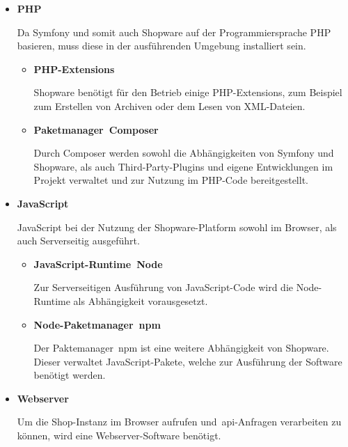 \begin{itemize}
    \item {
        \textbf{PHP}\par
        Da Symfony und somit auch Shopware auf der Programmiersprache PHP basieren, muss diese in der ausführenden
        Umgebung installiert sein.

        \begin{itemize}
            \item {
                \textbf{PHP-Extensions}\par
                Shopware benötigt für den Betrieb einige PHP-Extensions, zum Beispiel zum Erstellen von Archiven
                oder dem Lesen von XML-Dateien.
            }

            \item {
                \textbf{Paketmanager\ \glqq Composer\grqq}\par
                Durch Composer werden sowohl die Abhängigkeiten von Symfony und Shopware, als auch Third-Party-Plugins
                und eigene Entwicklungen im Projekt verwaltet und zur Nutzung im PHP-Code bereitgestellt.
            }
        \end{itemize}
    }

    \item {
        \textbf{JavaScript}\par
        JavaScript bei der Nutzung der Shopware-Platform sowohl im Browser, als auch Serverseitig ausgeführt.

        \begin{itemize}
            \item {
                \textbf{JavaScript-Runtime\ \glqq Node\grqq}\par
                Zur Serverseitigen Ausführung von JavaScript-Code wird die Node-Runtime als Abhängigkeit vorausgesetzt.
            }

            \item {
                \textbf{Node-Paketmanager\ \glqq\acrshort{npm}\grqq}\par
                Der Paktemanager\ \acrshort{npm} ist eine weitere Abhängigkeit von Shopware.
                Dieser verwaltet JavaScript-Pakete, welche zur Ausführung der Software benötigt werden.
            }
        \end{itemize}
    }

    \item {
        \textbf{Webserver}\par
        Um die Shop-Instanz im Browser aufrufen und\ \acrshort{api}-Anfragen verarbeiten zu können, wird eine
        Webserver-Software benötigt.
    }


\end{itemize}
